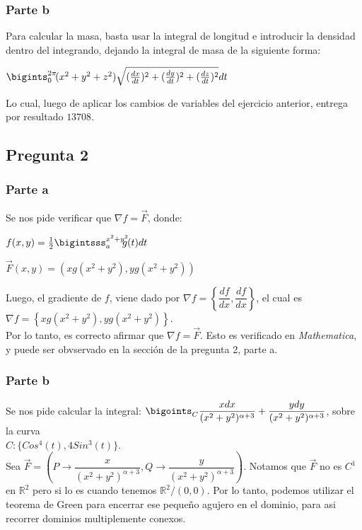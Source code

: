 \documentclass[12pt,letterpaper]{article}
\begin{document}
\subsubsection{Parte b}
Para calcular la masa, basta usar la integral de longitud e introducir la densidad dentro del integrando, dejando la integral de masa de la siguiente forma:

\begin{center}$\bigints_0^{2\pi} \! (x^2+y^2+z^2)\sqrt{(\frac{dx}{dt})^2+(\frac{dy}{dt})^2+(\frac{dz}{dt})^2} dt$\end{center}

Lo cual, luego de aplicar los cambios de variables del ejercicio anterior, entrega por resultado $13708$.

\subsection{Pregunta 2}
\subsubsection{Parte a}
Se nos pide verificar que $\nabla f= \vec{F}$, donde:

\begin{center}$f(x,y)=\frac{1}{2}\bigintsss_a^{x^2+y^2} \!\!\!\! g(t)dt$\end{center}
\begin{center}$\vec{F}(x,y)=(xg(x^2+y^2),yg(x^2+y^2))$\end{center}

Luego, el gradiente de $f$, viene dado por $\nabla f = \left\{\dfrac{df}{dx},\dfrac{df}{dx}\right\}$, el cual es\\ $\nabla f = \left\{xg(x^2+y^2),yg(x^2+y^2)\right\}$.\\

Por lo tanto, es correcto afirmar que $\nabla f= \vec{F}$. Esto es verificado en \textit{Mathematica}, y puede ser obvservado en la sección de la pregunta 2, parte a.

\subsubsection{Parte b}
Se nos pide calcular la integral: $\bigoints_C \dfrac{xdx}{(x^2+y^2)^{\alpha+3}} + \dfrac{ydy}{(x^2+y^2)^{\alpha+3}}$, sobre la curva \\ $C: \{Cos^4(t),4Sin^3(t)\}$.\\

Sea $\vec{F}=\left(P\rightarrow\dfrac{x}{(x^2+y^2)^{\alpha+3}},Q\rightarrow\dfrac{y}{(x^2+y^2)^{\alpha+3}}\right)$. Notamos que $\vec{F}$ no es $C^1$ en $\mathbb{R}^2$ pero si lo es cuando tenemos $\mathbb{R}^2 / {(0,0)}$. Por lo tanto, podemos utilizar el teorema de Green para encerrar ese pequeño agujero en el dominio, para asi recorrer dominios multiplemente conexos.
\end{document}
